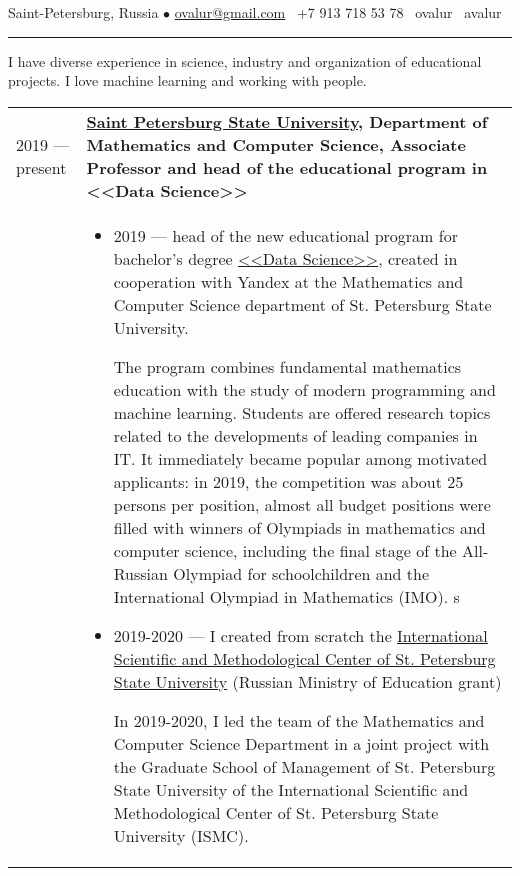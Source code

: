 \documentclass[11pt]{article}
\begin{document}
%

\vspace{0.5em}

\noindent Saint-Petersburg, Russia $\bullet$ \href{mailto:ovalur@gmail.com}{ovalur@gmail.com} \faMobile~+7 913 718 53 78 \faSendO~ovalur
\faGithub~avalur

\vspace{0.5em}
\hrule
\vspace{0.5em}

I have diverse experience in science, industry and organization of educational projects. I love machine learning and working with people.

\vspace{0.5em}
\begin{longtable} {l | p{}}

2019 — present & {\textbf{\href{https://spbu.ru}{Saint Petersburg State University}, Department of Mathematics and Computer Science, Associate Professor and head of the educational program in <<Data Science>>}} \\
& \vspace{-1.5em}
\begin{itemize}
	\item 2019 — head of the new educational program for bachelor's degree \href{https://maad.compscicenter.ru}{<<Data Science>>}, created in cooperation with Yandex at the Mathematics and Computer Science department of St. Petersburg State University.

  The program combines fundamental mathematics education with the study of modern programming and machine learning. Students are offered research topics related to the developments of leading companies in IT. It immediately became popular among motivated applicants: in 2019, the competition was about 25 persons per position, almost all budget positions were filled with winners of Olympiads in mathematics and computer science, including the final stage of the All-Russian Olympiad for schoolchildren and the International Olympiad in Mathematics (IMO).
s
  \item 2019-2020 — I created from scratch the \href{https://gsom.spbu.ru/all_news/event2021-02-04/}{International Scientific and Methodological Center of St. Petersburg State University} (Russian Ministry of Education grant)

  In 2019-2020, I led the team of the Mathematics and Computer Science Department in a joint project with the Graduate School of Management of St. Petersburg State University of the International Scientific and Methodological Center of St. Petersburg State University (ISMC).


\end{itemize}
\end{longtable}
\end{document}
